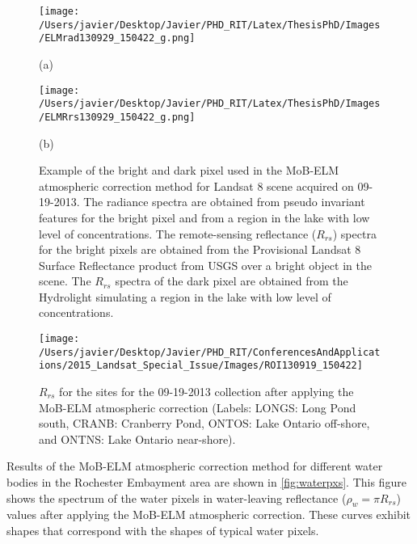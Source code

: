 \begin{figure}[H]
  \begin{minipage}[c]{0.48\linewidth}
    \centering
      \texttt{[image: /Users/javier/Desktop/Javier/PHD\_RIT/Latex/ThesisPhD/Images/ELMrad130929\_150422\_g.png]}
    \centerline{(a)}\medskip
  \end{minipage}
  \hfill
  \begin{minipage}[d]{0.48\linewidth}
    \centering
      \texttt{[image: /Users/javier/Desktop/Javier/PHD\_RIT/Latex/ThesisPhD/Images/ELMRrs130929\_150422\_g.png]}
    \centerline{(b)}\medskip
  \end{minipage}
  \caption[Example of the bright and dark pixel used in the MoB-ELM atmospheric correction method for Landsat 8 scene acquired on 09-19-2013.]{Example of the bright and dark pixel used in the MoB-ELM atmospheric correction method for Landsat 8 scene acquired on 09-19-2013. The radiance spectra are obtained from pseudo invariant features for the bright pixel and from a region in the lake with low level of concentrations. The remote-sensing reflectance ($R_{rs}$) spectra for the bright pixels are obtained from the Provisional Landsat 8 Surface Reflectance product from USGS over a bright object in the scene. The $R_{rs}$ spectra of the dark pixel are obtained from the Hydrolight simulating a region in the lake with low level of concentrations.\label{fig:MOBELMpxls} } 
\end{figure}

\begin{figure}[htbp!]
  \centering
  \texttt{[image: /Users/javier/Desktop/Javier/PHD\_RIT/ConferencesAndApplications/2015\_Landsat\_Special\_Issue/Images/ROI130919\_150422]}

  \caption[$R_{rs}$ for the sites for the 09-19-2013 collection after applying the MoB-ELM atmospheric correction.]{$R_{rs}$ for the sites for the 09-19-2013 collection after applying the MoB-ELM atmospheric correction (Labels: LONGS: Long Pond south, CRANB: Cranberry Pond, ONTOS: Lake Ontario off-shore, and ONTNS: Lake Ontario near-shore). \label{fig:RrsROIs_130919}} 
\end{figure}

Results of the MoB-ELM atmospheric correction method for different water bodies in the Rochester Embayment area are shown in \autoref{fig:waterpxs}. This figure shows the spectrum of the water pixels in water-leaving reflectance ($\rho_w=\pi R_{rs}$) values after applying the MoB-ELM atmospheric correction. These curves exhibit shapes that correspond with the shapes of typical water pixels. 


